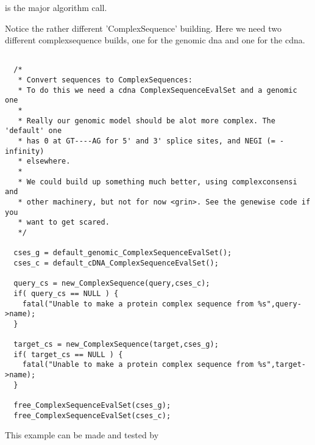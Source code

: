 is the major algorithm call. 

Notice the rather different 'ComplexSequence' building. Here we need two
different complexsequence builds, one for the genomic dna and one for the cdna.

\begin{verbatim}
  
  /*
   * Convert sequences to ComplexSequences: 
   * To do this we need a cdna ComplexSequenceEvalSet and a genomic one
   *
   * Really our genomic model should be alot more complex. The 'default' one
   * has 0 at GT----AG for 5' and 3' splice sites, and NEGI (= -infinity)
   * elsewhere. 
   *
   * We could build up something much better, using complexconsensi and 
   * other machinery, but not for now <grin>. See the genewise code if you
   * want to get scared.
   */
  
  cses_g = default_genomic_ComplexSequenceEvalSet();
  cses_c = default_cDNA_ComplexSequenceEvalSet();
  
  query_cs = new_ComplexSequence(query,cses_c);
  if( query_cs == NULL ) {
    fatal("Unable to make a protein complex sequence from %s",query->name);
  }
  
  target_cs = new_ComplexSequence(target,cses_g);
  if( target_cs == NULL ) {
    fatal("Unable to make a protein complex sequence from %s",target->name);
  }

  free_ComplexSequenceEvalSet(cses_g);
  free_ComplexSequenceEvalSet(cses_c);
\end{verbatim}

This example can be made and tested by

